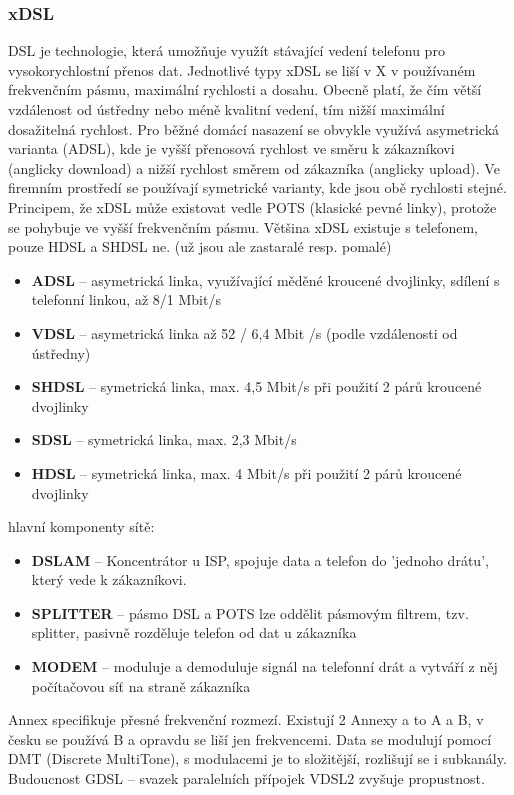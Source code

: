 \subsubsection{xDSL}
DSL je technologie, která umožňuje využít stávající vedení telefonu pro vysokorychlostní přenos dat. Jednotlivé typy xDSL se liší v X v používaném frekvenčním pásmu, maximální rychlosti a dosahu. Obecně platí, že čím větší vzdálenost od ústředny nebo méně kvalitní vedení, tím nižší maximální dosažitelná rychlost. Pro běžné domácí nasazení se obvykle využívá asymetrická varianta (ADSL), kde je vyšší přenosová rychlost ve směru k zákazníkovi (anglicky download) a nižší rychlost směrem od zákazníka (anglicky upload). Ve firemním prostředí se používají symetrické varianty, kde jsou obě rychlosti stejné. Principem, že xDSL může existovat vedle POTS (klasické pevné linky), protože se pohybuje ve vyšší frekvenčním pásmu. Většina xDSL existuje s telefonem, pouze HDSL a SHDSL ne. (už jsou ale zastaralé resp. pomalé)
\begin{itemize}
\item \textbf{ADSL} -- asymetrická linka, využívající měděné kroucené dvojlinky, sdílení s telefonní linkou, až 8/1 Mbit/s
\item \textbf{VDSL} -- asymetrická linka až 52 / 6,4 Mbit /s (podle vzdálenosti od ústředny)
\item \textbf{SHDSL} -- symetrická linka, max. 4,5 Mbit/s při použití 2 párů kroucené dvojlinky
\item \textbf{SDSL} -- symetrická linka, max. 2,3 Mbit/s
\item \textbf{HDSL} -- symetrická linka, max. 4 Mbit/s při použití 2 párů kroucené dvojlinky
\end{itemize}

hlavní komponenty sítě:
\begin{itemize}
\item \textbf{DSLAM} -- Koncentrátor u ISP, spojuje data a telefon do 'jednoho drátu', který vede k zákazníkovi.
\item \textbf{SPLITTER} -- pásmo DSL a POTS lze oddělit pásmovým filtrem, tzv. splitter, pasivně rozděluje telefon od dat u zákazníka
\item \textbf{MODEM} -- moduluje a demoduluje signál na telefonní drát a vytváří z něj počítačovou síť na straně zákazníka
\end{itemize}

Annex specifikuje přesné frekvenční rozmezí. Existují 2 Annexy a to A a B, v česku se používá B a opravdu se liší jen frekvencemi. Data se modulují pomocí DMT (Discrete MultiTone), s modulacemi je to složitější, rozlišují se i subkanály. Budoucnost GDSL – svazek paralelních přípojek VDSL2 zvyšuje propustnost.


